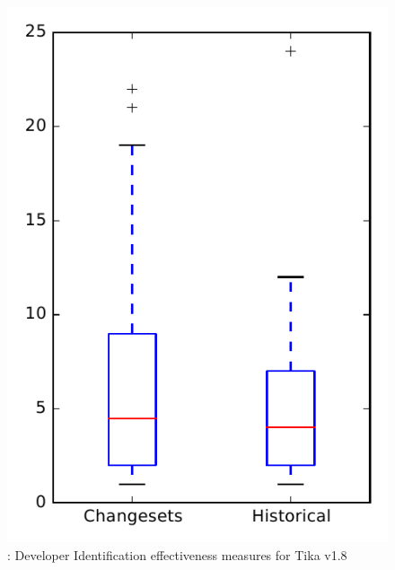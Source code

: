 
\begin{figure}
\centering
\includegraphics[height=0.4\textheight]{figures/dit/rq2_tika}
\caption{\dtwo: Developer Identification effectiveness measures for Tika v1.8}
\label{fig:dit:rq2:tika}
\end{figure}
